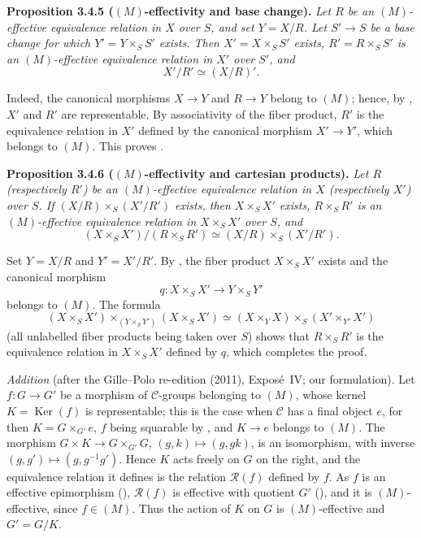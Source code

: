 \medskip
\noindent{}\textbf{Proposition 3.4.5 (\((M)\)-effectivity and base change).}
\textit{Let \(R\) be an \((M)\)-effective equivalence relation in \(X\)
over \(S\), and set \(Y=X/R\). Let \(S'\to S\) be a base change for which
\(Y'=Y\times_S S'\) exists. Then \(X'=X\times_S S'\) exists,
\(R'=R\times_S S'\) is an \((M)\)-effective equivalence relation in \(X'\)
over \(S'\), and}
\[
  X'/R'\simeq (X/R)'.
\]

Indeed, the canonical morphisms \(X\to Y\) and \(R\to Y\) belong to
\((M)\); hence, by , \(X'\) and \(R'\) are representable. By
associativity of the fiber product, \(R'\) is the equivalence relation in
\(X'\) defined by the canonical morphism \(X'\to Y'\), which belongs to
\((M)\). This proves .

\medskip
\noindent{}\textbf{Proposition 3.4.6 (\((M)\)-effectivity and cartesian
products).}
\textit{Let \(R\) (respectively \(R'\)) be an \((M)\)-effective equivalence
relation in \(X\) (respectively \(X'\)) over \(S\). If
\((X/R)\times_S(X'/R')\) exists, then \(X\times_SX'\) exists,
\(R\times_SR'\) is an \((M)\)-effective equivalence relation in
\(X\times_SX'\) over \(S\), and}
\[
  (X\times_SX')/(R\times_SR')
  \simeq (X/R)\times_S(X'/R').
\]

Set \(Y=X/R\) and \(Y'=X'/R'\). By , the fiber product
\(X\times_SX'\) exists and the canonical morphism
\[
  q:X\times_SX'\longrightarrow Y\times_SY'
\]
belongs to \((M)\). The formula
\[
  (X\times_SX')\times_{(Y\times_SY')}(X\times_SX')
  \simeq (X\times_YX)\times_S(X'\times_{Y'}X')
\]
(all unlabelled fiber products being taken over \(S\)) shows that
\(R\times_SR'\) is the equivalence relation in \(X\times_SX'\) defined by
\(q\), which completes the proof.

\par\medskip\noindent
\emph{Addition} (after the Gille--Polo re-edition (2011), Expos\'e~IV; our
formulation).  Let \(f\colon G\to G'\) be a morphism of
\(\mathscr C\)-groups belonging to \((M)\), whose kernel
\(K=\operatorname{Ker}(f)\) is representable; this is the case when
\(\mathscr C\) has a final object \(e\), for then \(K=G\times_{G'}e\), \(f\)
being squarable by , and \(K\to e\) belongs to \((M)\). The
morphism \(G\times K\to G\times_{G'}G\), \((g,k)\mapsto(g,gk)\), is an
isomorphism, with inverse \((g,g')\mapsto(g,g^{-1}g')\). Hence \(K\) acts
freely on \(G\) on the right, and the equivalence relation it defines is the
relation \(\mathscr R(f)\) defined by \(f\). As \(f\) is an effective
epimorphism (), \(\mathscr R(f)\) is effective with quotient \(G'\)
(), and it is \((M)\)-effective, since \(f\in(M)\). Thus the action of
\(K\) on \(G\) is \((M)\)-effective and \(G'=G/K\).
\par\medskip

